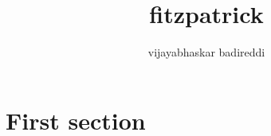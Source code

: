 \documentclass[12pt]{article}
\title{fitzpatrick}
\author{vijayabhaskar badireddi}
\begin{document}

\section*{First section}
\end{document}
